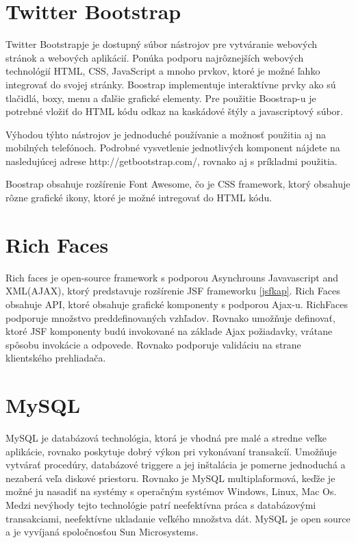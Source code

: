 \section{Twitter Bootstrap}\label{bootkap}
Twitter Bootstrapje je dostupný súbor nástrojov pre vytváranie webových stránok a webových aplikácií\cite{boot}. Ponúka podporu najrôznejších webových technológií HTML, CSS, JavaScript a mnoho prvkov, ktoré je možné ľahko integrovať do svojej stránky. Boostrap implementuje interaktívne prvky ako sú tlačidlá, boxy, menu a ďalšie grafické elementy. Pre použitie Boostrap-u je potrebné vložiť do HTML kódu odkaz  na  kaskádové štýly a javascriptový súbor.

Výhodou týhto nástrojov je jednoduché používanie a možnosť použitia aj na mobilných telefónoch. Podrobné vysvetlenie jednotlivých komponent nájdete na nasledujúcej adrese http://getbootstrap.com/, rovnako aj s príkladmi použitia. 

Boostrap obsahuje rozšírenie Font Awesome, čo je CSS framework, ktorý obsahuje rôzne grafické ikony, ktoré je možné intregovať do HTML kódu\cite{fontweb}.


\section{Rich Faces}\label{richkap}
Rich faces je open-source framework s podporou Asynchrouns Javavascript and\\ XML(AJAX)\cite{ajaxbook}, ktorý predstavuje rozšírenie JSF frameworku \ref{jsfkap}. Rich Faces obsahuje API, ktoré obsahuje grafické komponenty s podporou Ajax-u. RichFaces podporuje množstvo preddefinovaných vzhľadov. Rovnako umožňuje definovať, ktoré JSF komponenty budú invokované na základe Ajax požiadavky, vrátane spôsobu invokácie a odpovede. Rovnako podporuje validáciu na strane klientského prehliadača.


\section{MySQL}\label{mysqlkap}
MySQL je databázová technológia, ktorá je vhodná pre malé a stredne veľke aplikácie, rovnako poskytuje dobrý výkon pri vykonávaní transakcíí. Umožňuje vytvárať procedúry, databázové triggere a jej inštalácia je pomerne jednoduchá a nezaberá veľa diskové priestoru. Rovnako je MySQL multiplaformová, keďže je možné ju nasadiť na systémy s operačným systémov Windows, Linux, Mac Os. Medzi nevýhody tejto technológie patrí neefektívna práca s databázovými transakciami, neefektívne ukladanie veľkého množstva dát. MySQL je open source a je vyvíjaná spoločnosťou Sun Microsystems.

